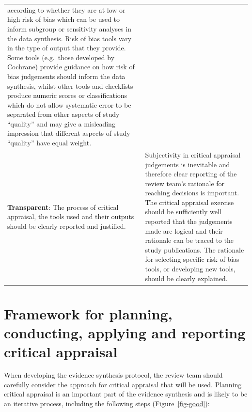 \documentclass[
  letterpaper,
  DIV=11,
  numbers=noendperiod]{scrreprt}
\begin{document}
\begin{longtable}[]{@{}
  >{\raggedright\arraybackslash}p{}
  >{\raggedright\arraybackslash}p{}@{}}
according to whether they are at low or high risk of bias which can be
used to inform subgroup or sensitivity analyses in the data synthesis.
Risk of bias tools vary in the type of output that they provide. Some
tools (e.g.~those developed by Cochrane) provide guidance on how risk of
bias judgements should inform the data synthesis, whilst other tools and
checklists produce numeric scores or classifications which do not allow
systematic error to be separated from other aspects of study ``quality''
and may give a misleading impression that different aspects of study
``quality'' have equal weight. \\
\textbf{Transparent}: The process of critical appraisal, the tools used
and their outputs should be clearly reported and justified. &
Subjectivity in critical appraisal judgements is inevitable and
therefore clear reporting of the review team's rationale for reaching
decisions is important. The critical appraisal exercise should be
sufficiently well reported that the judgements made are logical and
their rationale can be traced to the study publications. The rationale
for selecting specific risk of bias tools, or developing new tools,
should be clearly explained. \\
\end{longtable}

\section{Framework for planning, conducting, applying and reporting
critical
appraisal}\label{framework-for-planning-conducting-applying-and-reporting-critical-appraisal}

When developing the evidence synthesis protocol, the review team should
carefully consider the approach for critical appraisal that will be
used. Planning critical appraisal is an important part of the evidence
synthesis and is likely to be an iterative process, including the
following steps (Figure~\ref{fig-good}):
\end{document}
